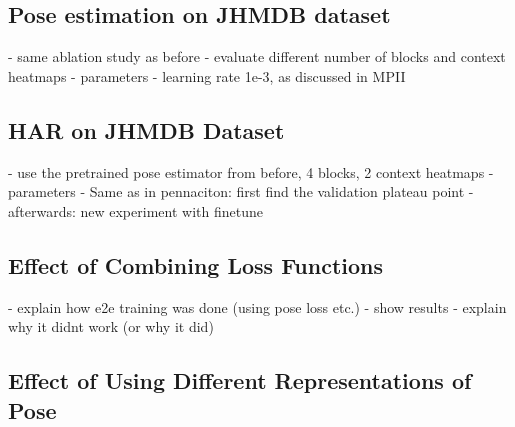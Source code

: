 \subsection{Pose estimation on JHMDB dataset}

- same ablation study as before
    - evaluate different number of blocks and context heatmaps
- parameters
    - learning rate 1e-3, as discussed in MPII



\subsection{HAR on JHMDB Dataset}
- use the pretrained pose estimator from before, 4 blocks, 2 context heatmaps
- parameters
- Same as in pennaciton: first find the validation plateau point
- afterwards: new experiment with finetune

\subsection{Effect of Combining Loss Functions}
- explain how e2e training was done (using pose loss etc.)
- show results
- explain why it didnt work (or why it did)

\subsection{Effect of Using Different Representations of Pose}
\label{sec:different_pose_representation_experiment}

